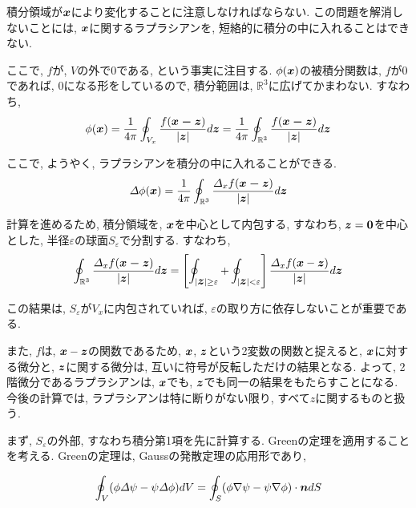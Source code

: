 \documentclass{jsarticle} \usepackage[dvipdfmx]{graphicx} \usepackage[dvipdfmx]{hyperref}
\newcommand*{\mbold}[1]{\mbox{\boldmath $#1$}}
\begin{document}
積分領域が$\mbold{x}$により変化することに注意しなければならない. 
この問題を解消しないことには, $\mbold{x}$に関するラプラシアンを, 短絡的に積分の中に入れることはできない. 

ここで, $f$が, $V$の外で$0$である, という事実に注目する. 
$\phi(\mbold{x})$の被積分関数は, $f$が$0$であれば, $0$になる形をしているので, 積分範囲は, $\mathbb{R}^3$に広げてかまわない. 
すなわち, 
\begin{equation}
  \phi(\mbold{x})
  = 
  \frac{1}{4 \pi} \oint_{V_x} \frac{f(\mbold{\mbold{x} - \mbold{z}})}{|\mbold{z}|}d\mbold{z}
  =
  \frac{1}{4 \pi} \oint_{\mathbb{R}^3} \frac{f(\mbold{\mbold{x} - \mbold{z}})}{|\mbold{z}|}d\mbold{z}
\end{equation}

ここで, ようやく, ラプラシアンを積分の中に入れることができる. 
\begin{equation}
  \varDelta \phi(\mbold{x})
  = 
  \frac{1}{4 \pi} \oint_{\mathbb{R}^3} \frac{\varDelta_x f(\mbold{\mbold{x} - \mbold{z}})}{|\mbold{z}|}d\mbold{z} 
\end{equation}

計算を進めるため, 積分領域を, $\mbold{x}$を中心として内包する, すなわち, $\mbold{z} = \mbold{0}$を中心とした, 半径$\varepsilon$の球面$S_\varepsilon$で分割する. 
すなわち, 
\begin{equation}
  \oint_{\mathbb{R}^3} \frac{\varDelta_x f(\mbold{\mbold{x} - \mbold{z}})}{|\mbold{z}|}d\mbold{z} 
  =
  \left[ \oint_{|\mbold{z}| \geq \varepsilon} + \oint_{|\mbold{z}| < \varepsilon} \right] \frac{\varDelta_x f(\mbold{x} - \mbold{z})}{|\mbold{z}|}d\mbold{z}
\end{equation}

この結果は, $S_\varepsilon$が$V_x$に内包されていれば, $\varepsilon$の取り方に依存しないことが重要である. 

また, $f$は, $\mbold{x} - \mbold{z}$の関数であるため, $\mbold{x}$, $\mbold{z}$という2変数の関数と捉えると, $\mbold{x}$に対する微分と, $\mbold{z}$に関する微分は, 互いに符号が反転しただけの結果となる. 
よって, 2階微分であるラプラシアンは, $\mbold{x}$でも, $\mbold{z}$でも同一の結果をもたらすことになる. 
今後の計算では, ラプラシアンは特に断りがない限り, すべて$z$に関するものと扱う. 

まず, $S_\varepsilon$の外部, すなわち積分第1項を先に計算する. 
Greenの定理を適用することを考える. Greenの定理は, Gaussの発散定理の応用形であり, 

\begin{equation}
  \oint_V (\phi \varDelta \psi - \psi \varDelta \phi)dV = \oint_S (\phi \nabla \psi - \psi \nabla \phi) \cdot \mbold{n} dS
\end{equation}
\end{document}
